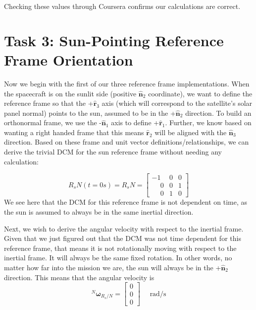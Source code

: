 \documentclass[conf]{new-aiaa}
\begin{document}
Checking these values through Coursera confirms our calculations are correct.


















\section{Task 3: Sun-Pointing Reference Frame Orientation}
Now we begin with the first of our three reference frame implementations. When the spacecraft is on the sunlit side (positive $\hat{\bm{n}}_2$ coordinate), we want to define the reference frame so that the +$\hat{\bm{r}}_3$ axis (which will correspond to the satellite's solar panel normal) points to the sun, assumed to be in the +$\hat{\bm{n}}_2$ direction. To build an orthonormal frame, we use the -$\hat{\bm{n}}_1$ axis to define +$\hat{\bm{r}}_1$. Further, we know based on wanting a right handed frame that this means $\hat{\bm{r}}_2$ will be aligned with the $\hat{\bm{n}}_3$ direction. Based on these frame and unit vector definitions/relationships, we can derive the trivial DCM for the sun reference frame without needing any calculation:

\[
R_sN(t = 0s) = R_sN = 
\begin{bmatrix}
-1 & 0 & 0 \\
\phantom{-}0 & 0 & 1 \\
\phantom{-}0 & 1 & 0
\end{bmatrix}
\]
We see here that the DCM for this reference frame is not dependent on time, as the sun is assumed to always be in the same inertial direction.

Next, we wish to derive the angular velocity with respect to the inertial frame. Given that we just figured out that the DCM was not time dependent for this reference frame, that means it is not rotationally moving with respect to the inertial frame. It will always be the same fixed rotation. In other words, no matter how far into the mission we are, the sun will always be in the +$\hat{\bm{n}}_2$ direction. This means that the angular velocity is 
\[
{}^N\bm{\omega}_{R_s/N} = 
\begin{bmatrix}
0 \\ 0 \\ 0
\end{bmatrix} \quad\text{ rad/s}
\]
\end{document}
